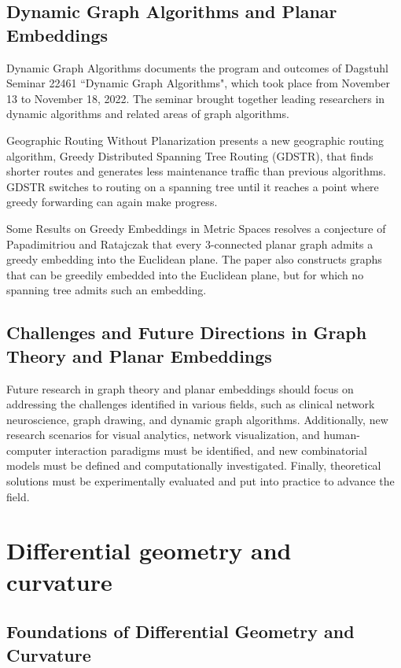 \documentclass{article}
\begin{document}
\subsection{Dynamic Graph Algorithms and Planar Embeddings}

Dynamic Graph Algorithms \cite{Eppstein2010DynamicGA} documents the program and outcomes of Dagstuhl Seminar 22461 ``Dynamic Graph Algorithms", which took place from November 13 to November 18, 2022. The seminar brought together leading researchers in dynamic algorithms and related areas of graph algorithms.

Geographic Routing Without Planarization \cite{Leong2006GeographicRW} presents a new geographic routing algorithm, Greedy Distributed Spanning Tree Routing (GDSTR), that finds shorter routes and generates less maintenance traffic than previous algorithms. GDSTR switches to routing on a spanning tree until it reaches a point where greedy forwarding can again make progress.

Some Results on Greedy Embeddings in Metric Spaces \cite{Moitra2008SomeRO} resolves a conjecture of Papadimitriou and Ratajczak that every 3-connected planar graph admits a greedy embedding into the Euclidean plane. The paper also constructs graphs that can be greedily embedded into the Euclidean plane, but for which no spanning tree admits such an embedding.

\subsection{Challenges and Future Directions in Graph Theory and Planar Embeddings}

Future research in graph theory and planar embeddings should focus on addressing the challenges identified in various fields, such as clinical network neuroscience, graph drawing, and dynamic graph algorithms. Additionally, new research scenarios for visual analytics, network visualization, and human-computer interaction paradigms must be identified, and new combinatorial models must be defined and computationally investigated. Finally, theoretical solutions must be experimentally evaluated and put into practice to advance the field.


\section{Differential geometry and curvature}

\subsection{Foundations of Differential Geometry and Curvature}
\end{document}

